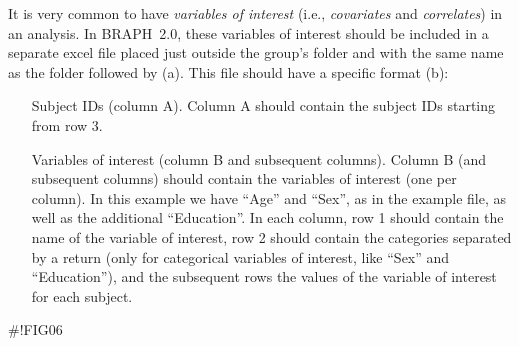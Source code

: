 \documentclass[justified]{tufte-handout}
\begin{document}
It is very common to have \emph{variables of interest} (i.e., \emph{covariates} and \emph{correlates}) in an analysis. In BRAPH~2.0, these variables of interest should be included in a separate excel file placed just outside the group's folder and with the same name as the folder followed by  (a). This file should have a specific format (b):
\begin{itemize}

\item[Subject IDs (column A).]
Column A should contain the subject IDs starting from row 3.

\item[Variables of interest (column B and subsequent columns).]
Column B (and subsequent columns) should contain the variables of interest (one per column). 
In this example we have ``Age'' and ``Sex'', as in the example file, as well as the additional ``Education''.
In each column, row 1 should contain the name of the variable of interest, row 2 should contain the categories separated by a return (only for categorical variables of interest, like ``Sex'' and ``Education''), and the subsequent rows the values of the variable of interest for each subject.

\end{itemize}
#!FIG06
\end{document}
